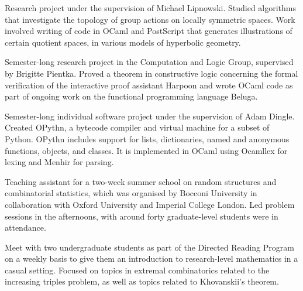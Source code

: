 \medbreak
{}
\smallskip
Research project under the supervision of Michael Lipnowski.
Studied algorithms that investigate the topology of group actions on locally symmetric spaces.
Work involved writing of code in OCaml and PostScript that generates illustrations of certain quotient
spaces, in various models of hyperbolic geometry.
\medbreak

\smallskip
Semester-long research project in the Computation and Logic Group, supervised
by Brigitte Pientka.
Proved a theorem in constructive logic concerning the formal verification
of the interactive proof assistant Harpoon and wrote OCaml code as part of
ongoing work on the functional programming language Beluga.
\medbreak

\smallskip
Semester-long individual software project under the supervision of Adam Dingle.
Created OPythn, a bytecode compiler and virtual machine for a subset of Python.
OPythn includes support for lists, dictionaries, named and anonymous functions, objects, and classes.
It is implemented in OCaml using Ocamllex for lexing and Menhir for parsing.


\smallskip
Teaching assistant for a two-week summer school on random structures and combinatorial statistics,
which was
organised by Bocconi University in collaboration with Oxford University
and Imperial College London. Led problem sessions in the afternoons, with
around forty graduate-level students were in attendance.
\medbreak

\smallskip
Meet with two undergraduate students as part of the Directed Reading Program
on a weekly basis to give them an introduction to research-level
mathematics in a casual setting. Focused on topics in extremal combinatorics related to the increasing
triples problem, as well as topics related to Khovanskii's theorem.
\medbreak

